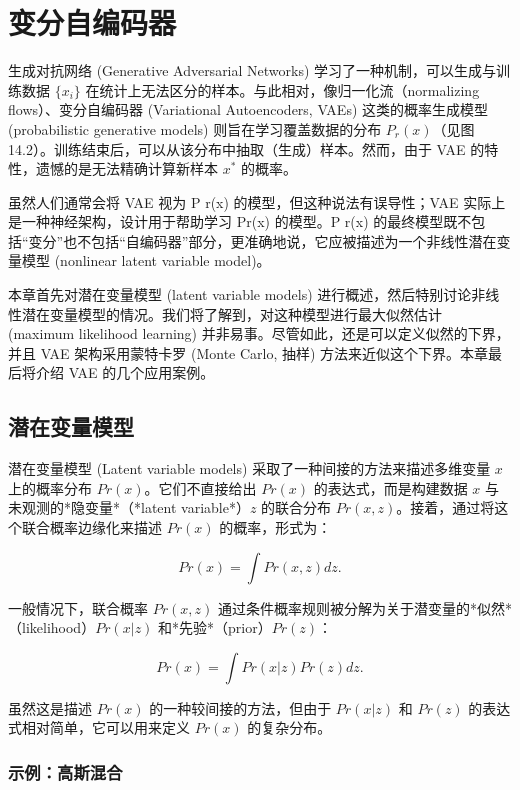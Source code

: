 \chapter{变分自编码器}

生成对抗网络 (Generative Adversarial Networks) 学习了一种机制，可以生成与训练数据 \(\{x_i\}\) 在统计上无法区分的样本。与此相对，像归一化流（normalizing flows）、变分自编码器 (Variational Autoencoders, VAEs) 这类的概率生成模型 (probabilistic generative models) 则旨在学习覆盖数据的分布 \(P_r(x)\)（见图 14.2）。训练结束后，可以从该分布中抽取（生成）样本。然而，由于 VAE 的特性，遗憾的是无法精确计算新样本 \(x^*\) 的概率。

虽然人们通常会将 VAE 视为 P r(x) 的模型，但这种说法有误导性；VAE 实际上是一种神经架构，设计用于帮助学习 Pr(x) 的模型。P r(x) 的最终模型既不包括“变分”也不包括“自编码器”部分，更准确地说，它应被描述为一个非线性潜在变量模型 (nonlinear latent variable model)。

本章首先对潜在变量模型 (latent variable models) 进行概述，然后特别讨论非线性潜在变量模型的情况。我们将了解到，对这种模型进行最大似然估计 (maximum likelihood learning) 并非易事。尽管如此，还是可以定义似然的下界，并且 VAE 架构采用蒙特卡罗 (Monte Carlo, 抽样) 方法来近似这个下界。本章最后将介绍 VAE 的几个应用案例。
\section{潜在变量模型}

潜在变量模型 (Latent variable models) 采取了一种间接的方法来描述多维变量 \(x\) 上的概率分布 \(Pr(x)\)。它们不直接给出 \(Pr(x)\) 的表达式，而是构建数据 \(x\) 与未观测的*隐变量*（*latent variable*）\(z\) 的联合分布 \(Pr(x, z)\)。接着，通过将这个联合概率边缘化来描述 \(Pr(x)\) 的概率，形式为：

\begin{equation}
Pr(x) = \int Pr(x, z)dz. 
\end{equation}

一般情况下，联合概率 \(Pr(x, z)\) 通过条件概率规则被分解为关于潜变量的*似然*（likelihood）\(Pr(x|z)\) 和*先验*（prior）\(Pr(z)\)：

\begin{equation}
Pr(x) = \int Pr(x|z)Pr(z)dz. 
\end{equation}

虽然这是描述 \(Pr(x)\) 的一种较间接的方法，但由于 \(Pr(x|z)\) 和 \(Pr(z)\) 的表达式相对简单，它可以用来定义 \(Pr(x)\) 的复杂分布。

\subsection{示例：高斯混合}


